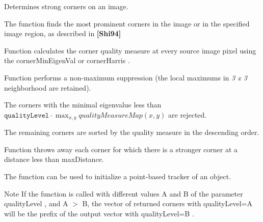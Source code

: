 Determines strong corners on an image. 

The function finds the most prominent corners in the image or in the specified image region, as described in {\bfseries [Shi94]} 


\begin{DoxyItemize}
\item Function calculates the corner quality measure at every source image pixel using the corner\+Min\+Eigen\+Val or corner\+Harris .
\item Function performs a non-\/maximum suppression (the local maximums in {\itshape 3 x 3} neighborhood are retained).
\item The corners with the minimal eigenvalue less than $\texttt{qualityLevel} \cdot \max_{x,y} qualityMeasureMap(x,y)$ are rejected.
\item The remaining corners are sorted by the quality measure in the descending order.
\item Function throws away each corner for which there is a stronger corner at a distance less than max\+Distance. 
\end{DoxyItemize}

The function can be used to initialize a point-\/based tracker of an object. 

\begin{DoxyNote}{Note}
If the function is called with different values A and B of the parameter quality\+Level , and A $>$ B, the vector of returned corners with quality\+Level=A will be the prefix of the output vector with quality\+Level=B . 
\end{DoxyNote}


